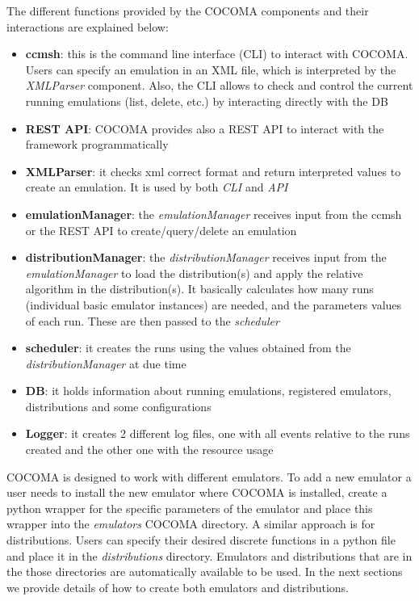 \documentclass[letterpaper,10pt,english]{sphinxhowto}
\begin{document}
The different functions provided by the COCOMA components and their interactions are explained below:
\begin{itemize}
\item {} 
\textbf{ccmsh}: this is the command line interface (CLI) to interact with COCOMA. Users can specify an emulation in an XML file, which is interpreted by the \emph{XMLParser} component. Also, the CLI allows to check and control the current running emulations (list, delete, etc.) by interacting directly with the DB

\item {} 
\textbf{REST API}: COCOMA provides also a REST API to interact with the framework programmatically

\item {} 
\textbf{XMLParser}: it checks xml correct format and return interpreted values to create an emulation. It is used by both \emph{CLI} and \emph{API}

\item {} 
\textbf{emulationManager}: the \emph{emulationManager} receives input from the ccmsh or the REST API to create/query/delete an emulation

\item {} 
\textbf{distributionManager}: the \emph{distributionManager} receives input from the \emph{emulationManager} to load the distribution(s) and apply the relative algorithm in the distribution(s). It basically calculates how many runs (individual basic emulator instances) are needed, and the parameters values of each run.  These are then passed to the \emph{scheduler}

\item {} 
\textbf{scheduler}: it creates the runs using the values obtained from the \emph{distributionManager} at due time

\item {} 
\textbf{DB}: it holds information about running emulations, registered emulators, distributions and some configurations

\item {} 
\textbf{Logger}: it creates 2 different log files, one with all events relative to the runs created and the other one with the resource usage

\end{itemize}

COCOMA is designed to work with different emulators. To add a new emulator a user needs to install the new emulator where COCOMA is installed, create a python wrapper for the specific parameters of the emulator and place this wrapper into the \emph{emulators} COCOMA directory. A similar approach is for distributions. Users can specify their desired discrete functions in a python file and place it in the \emph{distributions} directory. Emulators and distributions that are in the those directories are automatically available to be used. In the next sections we provide details of how to create both emulators and distributions.
\end{document}
